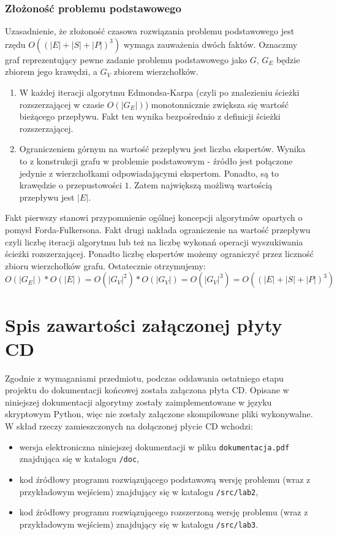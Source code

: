 \documentclass[12pt,a4paper]{article}
\theoremstyle{definition}
\begin{document}
\subsubsection{Złożoność problemu podstawowego} \label{boundedflow}
Uzasadnienie, że złożoność czasowa rozwiązania problemu podstawowego jest rzędu $O((|E| + |S| + |P|)^3)$ wymaga zauważenia dwóch faktów. Oznaczmy graf reprezentujący pewne zadanie problemu podstawowego jako $G$, $G_E$ będzie zbiorem jego krawędzi, a $G_V$ zbiorem wierzchołków.
\begin{enumerate}
	\item W każdej iteracji algorytmu Edmondsa-Karpa (czyli po znalezieniu ścieżki rozszerzającej w czasie $O(|G_E|)$) monotonnicznie zwiększa się wartość bieżącego przepływu. Fakt ten wynika bezpośrednio z definicji ścieżki rozszerzającej.
	\item Ograniczeniem górnym na wartość przepływu jest liczba ekspertów. Wynika to z konstrukcji grafu w problemie podstawowym - źródło jest połączone jedynie z wierzchołkami odpowiadającymi ekspertom. Ponadto, są to krawędzie o przepustowości $1$. Zatem największą możliwą wartością przepływu jest $|E|$.
\end{enumerate}
Fakt pierwszy stanowi przypomnienie ogólnej koncepcji algorytmów opartych o pomysł Forda-Fulkersona. Fakt drugi nakłada ograniczenie na wartość przepływu czyli liczbę iteracji algorytmu lub też na liczbę wykonań operacji wyszukiwania ścieżki rozszerzającej. Ponadto liczbę ekspertów możemy ograniczyć przez liczność zbioru wierzchołków grafu. Ostatecznie otrzymujemy:
$$O(|G_E|) * O(|E|) = O(|G_V|^2) * O(|G_V|) = O(|G_V|^3) = O((|E| + |S| + |P|)^3)$$

\newpage
\section{Spis zawartości załączonej płyty CD}
Zgodnie z wymaganiami przedmiotu, podczas oddawania ostatniego etapu projektu do dokumentacji końcowej została załączona płyta CD. Opisane w niniejszej dokumentacji algorytmy zostały zaimplementowane w języku skryptowym Python, więc nie zostały załączone skompilowane pliki wykonywalne.\\

\noindent
W skład rzeczy zamieszczonych na dołączonej płycie CD wchodzi:
\begin{itemize}
	\item wersja elektroniczna niniejszej dokumentacji w pliku \texttt{dokumentacja.pdf} znajdująca się w katalogu \texttt{/doc},
	\item kod źródłowy programu rozwiązującego podstawową wersję problemu (wraz z przykładowym wejściem) znajdujący się w katalogu \texttt{/src/lab2},
	\item kod źródłowy programu rozwiązującego rozszerzoną wersję problemu (wraz z przykładowym wejściem) znajdujący się w katalogu \texttt{/src/lab3}.
\end{itemize}
\end{document}
